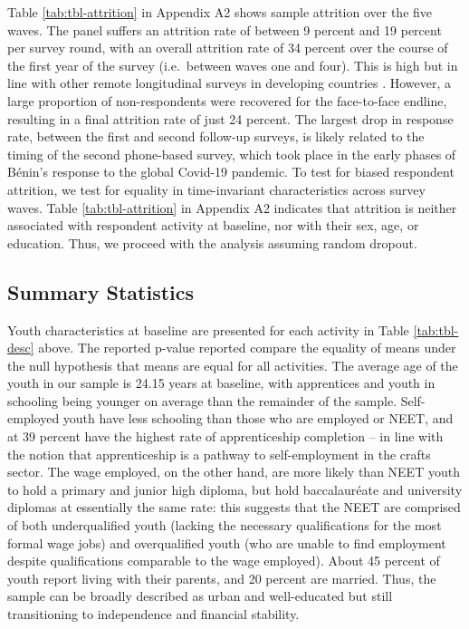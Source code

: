 \documentclass[
  a4paper, twoside, 12pt]{book}
\begin{document}
Table \ref{tab:tbl-attrition} in Appendix A2 shows sample attrition over the five waves. The panel suffers an attrition rate of between 9 percent and 19 percent per survey round, with an overall attrition rate of 34 percent over the course of the first year of the survey (i.e.~between waves one and four). This is high but in line with other remote longitudinal surveys in developing countries \autocite{demombynes2013,ballivian2015}. However, a large proportion of non-respondents were recovered for the face-to-face endline, resulting in a final attrition rate of just 24 percent. The largest drop in response rate, between the first and second follow-up surveys, is likely related to the timing of the second phone-based survey, which took place in the early phases of Bénin's response to the global Covid-19 pandemic. To test for biased respondent attrition, we test for equality in time-invariant characteristics across survey waves. Table \ref{tab:tbl-attrition} in Appendix A2 indicates that attrition is neither associated with respondent activity at baseline, nor with their sex, age, or education. Thus, we proceed with the analysis assuming random dropout.

\hypertarget{survey-summary}{%
\subsection*{Summary Statistics}\label{survey-summary}}

\begin{singlespacing}

\end{singlespacing}

Youth characteristics at baseline are presented for each activity in Table \ref{tab:tbl-desc} above. The reported p-value reported compare the equality of means under the null hypothesis that means are equal for all activities. The average age of the youth in our sample is 24.15 years at baseline, with apprentices and youth in schooling being younger on average than the remainder of the sample. Self-employed youth have less schooling than those who are employed or NEET, and at 39 percent have the highest rate of apprenticeship completion -- in line with the notion that apprenticeship is a pathway to self-employment in the crafts sector. The wage employed, on the other hand, are more likely than NEET youth to hold a primary and junior high diploma, but hold baccalauréate and university diplomas at essentially the same rate: this suggests that the NEET are comprised of both underqualified youth (lacking the necessary qualifications for the most formal wage jobs) and overqualified youth (who are unable to find employment despite qualifications comparable to the wage employed). About 45 percent of youth report living with their parents, and 20 percent are married. Thus, the sample can be broadly described as urban and well-educated but still transitioning to independence and financial stability.
\end{document}
